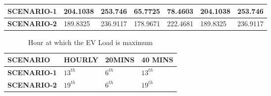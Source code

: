 \begin{table}[h]
\begin{tabular}{|cl|ll|ll|ll|}
			\multicolumn{2}{|c|}{\textbf{SCENARIO-1}}                & \multicolumn{1}{l|}{204.1038}                                                                                  & 253.746                                                                                                         & \multicolumn{1}{l|}{65.7725}                                                                                   & 78.4603                                                                                                         & \multicolumn{1}{l|}{204.1038}                                                                                  & 253.746                                                                                                         \\ \hline
			\multicolumn{2}{|c|}{\textbf{SCENARIO-2}}                & \multicolumn{1}{l|}{189.8325}                                                                                  & 236.9117                                                                                                        & \multicolumn{1}{l|}{178.9671}                                                                                  & 222.4681                                                                                                        & \multicolumn{1}{l|}{189.8325}                                                                                  & 236.9117                                                                                                        \\ \hline
		\end{tabular}
			\label{table:powerloss}
	\end{table}


	

	\begin{table}[h]
		\centering
		\caption{Hour at which the EV Load is maximum }
		\begin{tabular}{|ll|ll|ll|ll|}
			\hline
			\multicolumn{2}{|l|}{\textbf{SCENARIO}} & \multicolumn{2}{l|}{\textbf{HOURLY}} & \multicolumn{2}{l|}{\textbf{20MINS}} & \multicolumn{2}{l|}{\textbf{40 MINS}} \\ \hline
			\multicolumn{2}{|l|}{\textbf{SCENARIO-1}}        & \multicolumn{2}{l|}{$ 13^{th} $}            & \multicolumn{2}{l|}{$ 6^{th} $}             & \multicolumn{2}{l|}{$ 13^{th} $}             \\ \hline
			\multicolumn{2}{|l|}{\textbf{SCENARIO-2}}        & \multicolumn{2}{l|}{$ 19^{th} $}           & \multicolumn{2}{l|}{$ 6^{th} $}             & \multicolumn{2}{l|}{$ 19^{th} $}             \\ \hline
		\end{tabular}
	\end{table}
		
